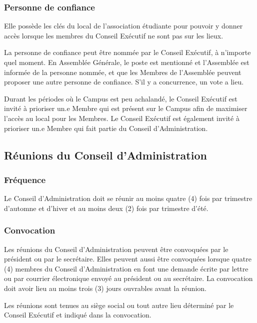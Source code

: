 \documentclass{aediroum}
\begin{document}
\subsubsection{Personne de confiance}\label{sec:personne-de-confiance}
Elle possède les clés du local de l'association étudiante pour pouvoir y donner accès lorsque les membres du Conseil Exécutif ne sont pas sur les lieux.

La personne de confiance peut être nommée par le Conseil Exécutif, à n'importe quel moment.
En Assemblée Générale, le poste est mentionné et l'Assemblée est informée de la personne nommée, et que les Membres de l'Assemblée peuvent proposer une autre personne de confiance. S'il y a concurrence, un vote a lieu.

Durant les périodes où le Campus est peu achalandé, le Conseil Exécutif est invité à prioriser un.e Membre qui est présent sur le Campus afin de maximiser l'accès au local pour les Membres. Le Conseil Exécutif est également invité à prioriser un.e Membre qui fait partie du Conseil d'Administration.

\subsection{Réunions du Conseil d'Administration}\label{sec:reunions-du-conseil-dadministration}
\subsubsection{Fréquence}\label{sec:frequence}

Le Conseil d'Administration doit se réunir au moins quatre (4) fois par trimestre d'automne et d'hiver et au moins deux (2) fois par trimestre d'été.

\subsubsection{Convocation}\label{sec:convocation-administration}

Les réunions du Conseil d'Administration peuvent être convoquées par le président ou par le secrétaire. Elles peuvent aussi être convoquées lorsque quatre (4) membres du Conseil d'Administration en font une demande écrite par lettre ou par courrier électronique envoyé au président ou au secrétaire. La convocation doit avoir lieu au moins trois (3) jours ouvrables avant la réunion.

Les réunions sont tenues au siège social ou tout autre lieu déterminé par le Conseil Exécutif et indiqué dans la convocation.
\end{document}
